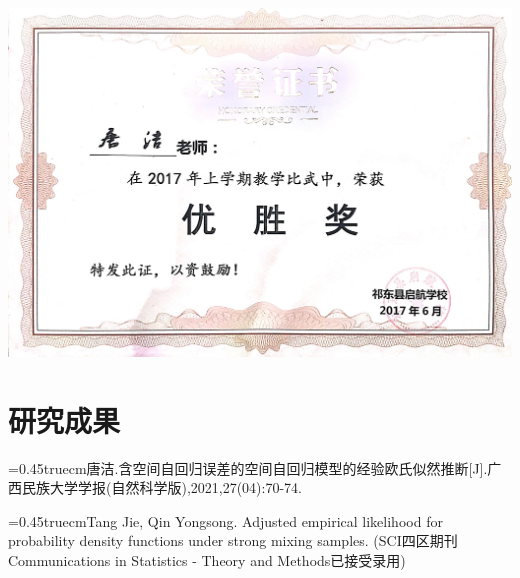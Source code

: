 \documentclass[UFT8]{ctexart}%
\def\nh{\noindent\hangindent=0.45truecm\hangafter=1}
\begin{document}
\begin{center}
 \includegraphics[scale=0.16]{figs/201706.JPG }
\end{center}

\section{研究成果}

\nh 唐洁.含空间自回归误差的空间自回归模型的经验欧氏似然推断[J].广西民族大学学报(自然科学版),2021,27(04):70-74.

\nh  Tang Jie, Qin Yongsong. Adjusted empirical likelihood for probability density functions under strong mixing samples. (SCI四区期刊Communications in Statistics - Theory and Methods已接受录用)



\end{document}
